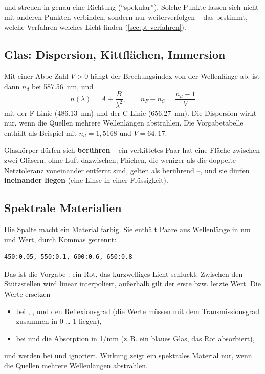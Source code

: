  und  streuen in genau eine Richtung (\enquote{spekular}). Solche Punkte
lassen sich nicht mit anderen Punkten verbinden, sondern nur weiterverfolgen -- das bestimmt,
welche Verfahren welches Licht finden (\autoref{sec:pt-verfahren}).

\subsection{Glas: Dispersion, Kittflächen, Immersion}\label{sec:pt-glas}

Mit einer Abbe-Zahl $V > 0$ hängt der Brechungsindex von der Wellenlänge ab.  ist dann
$n_d$ bei \SI{587.56}{\nano\metre}, und
\[
  n(\lambda) = A + \frac{B}{\lambda^2}, \qquad n_F - n_C = \frac{n_d - 1}{V}
\]
mit der F-Linie (\SI{486.13}{\nano\metre}) und der C-Linie (\SI{656.27}{\nano\metre}). Die
Dispersion wirkt nur, wenn die Quellen mehrere Wellenlängen abstrahlen. Die Vorgabetabelle
enthält als Beispiel  mit $n_d = 1{,}5168$ und $V = 64{,}17$.

Glaskörper dürfen sich \textbf{berühren} -- ein verkittetes Paar hat eine Fläche zwischen zwei
Gläsern, ohne Luft dazwischen; Flächen, die weniger als die doppelte Netztoleranz voneinander
entfernt sind, gelten als berührend --, und sie dürfen \textbf{ineinander liegen} (eine Linse in
einer Flüssigkeit).

\subsection{Spektrale Materialien}\label{sec:pt-spektral}

Die Spalte  macht ein Material farbig. Sie enthält Paare aus Wellenlänge in nm
und Wert, durch Kommas getrennt:
\begin{lstlisting}
450:0.05, 550:0.1, 600:0.6, 650:0.8
\end{lstlisting}
Das ist die Vorgabe : ein Rot, das kurzwelliges Licht schluckt. Zwischen den
Stützstellen wird linear interpoliert, außerhalb gilt der erste bzw. letzte Wert. Die Werte
ersetzen
\begin{itemize}
  \item bei , ,  und  den Reflexionsgrad (die
    Werte müssen mit dem Transmissionsgrad zusammen in 0 \dots{} 1 liegen),
  \item bei  und  die Absorption in 1/mm (z.\,B. ein blaues Glas, das Rot
    absorbiert),
\end{itemize}
und werden bei  und  ignoriert. Wirkung zeigt ein spektrales
Material nur, wenn die Quellen mehrere Wellenlängen abstrahlen.

